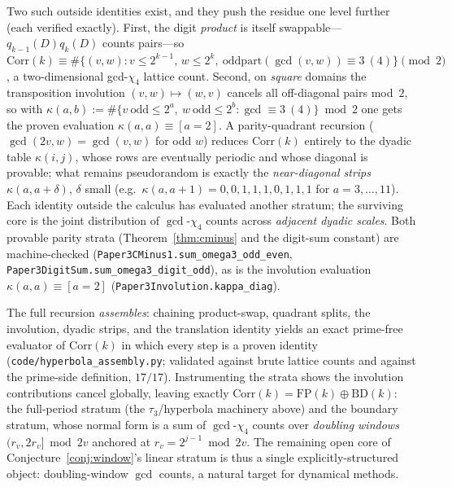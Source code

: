 \documentclass[11pt]{article}
\theoremstyle{remark}\newtheorem{remark}[theorem]{Remark}
\begin{document}
Two such outside identities exist, and they push the residue one level further (each verified
exactly). First, the digit \emph{product} is itself swappable---$q_{k-1}(D)q_k(D)$ counts pairs---so
$\mathrm{Corr}(k)\equiv\#\{(v,w):v\le2^{k-1},\,w\le2^k,\ \mathrm{oddpart}(\gcd(v,w))\equiv3\
(4)\}\pmod2$, a two-dimensional gcd-$\chi_4$ lattice count. Second, on \emph{square} domains the
transposition involution $(v,w)\mapsto(w,v)$ cancels all off-diagonal pairs mod~$2$, so with
$\kappa(a,b):=\#\{v\ \mathrm{odd}\le2^a,\ w\ \mathrm{odd}\le2^b:\gcd\equiv3\ (4)\}\bmod2$ one gets
the proven evaluation $\kappa(a,a)\equiv[a{=}2]$. A parity-quadrant recursion
($\gcd(2v,w)=\gcd(v,w)$ for odd $w$) reduces $\mathrm{Corr}(k)$ entirely to the dyadic table
$\kappa(i,j)$, whose rows are eventually periodic and whose diagonal is provable; what remains
pseudorandom is exactly the \emph{near-diagonal strips} $\kappa(a,a{+}\delta)$, $\delta$ small
(e.g.\ $\kappa(a,a{+}1)=0,0,1,1,1,0,1,1,1$ for $a=3,\dots,11$). Each identity outside the calculus
has evaluated another stratum; the surviving core is the joint distribution of $\gcd$-$\chi_4$
counts across \emph{adjacent dyadic scales}. Both provable parity strata (Theorem~\ref{thm:cminus}
and the digit-sum constant) are machine-checked
(\texttt{Paper3CMinus1.sum\_omega3\_odd\_even}, \texttt{Paper3DigitSum.sum\_omega3\_digit\_odd}),
as is the involution evaluation $\kappa(a,a)\equiv[a{=}2]$
(\texttt{Paper3Involution.kappa\_diag}).

The full recursion \emph{assembles}: chaining product-swap, quadrant splits, the involution,
dyadic strips, and the translation identity yields an exact prime-free evaluator of
$\mathrm{Corr}(k)$ in which every step is a proven identity
(\texttt{code/hyperbola\_assembly.py}; validated against brute lattice counts and against the
prime-side definition, $17/17$). Instrumenting the strata shows the involution contributions cancel
globally, leaving exactly $\mathrm{Corr}(k)=\mathrm{FP}(k)\oplus\mathrm{BD}(k)$: the full-period
stratum (the $\tau_3$/hyperbola machinery above) and the boundary stratum, whose normal form is a
sum of $\gcd$-$\chi_4$ counts over \emph{doubling windows} $(r_v,2r_v]\bmod 2v$ anchored at
$r_v=2^{j-1}\bmod 2v$. The remaining open core of Conjecture~\ref{conj:window}'s linear stratum is thus a
single explicitly-structured object: doubling-window $\gcd$ counts, a natural target for
dynamical methods.
\end{document}
